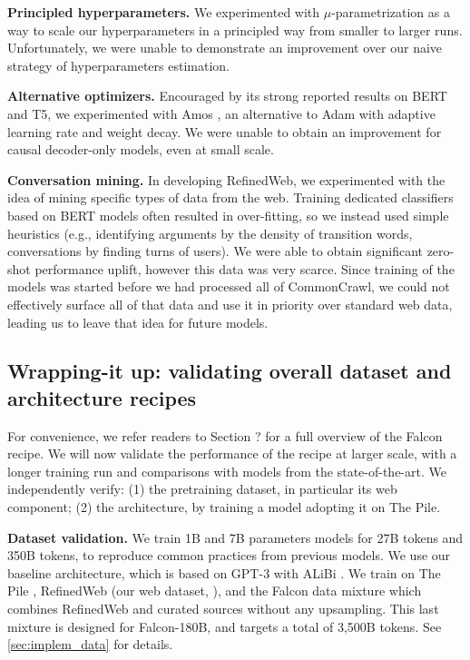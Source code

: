 \documentclass{article}
\begin{document}
\textbf{Principled hyperparameters.} We experimented with $\mu$-parametrization \citep{yang2022tensor} as a way to scale our hyperparameters in a principled way from smaller to larger runs. Unfortunately, we were unable to demonstrate an improvement over our naive strategy of hyperparameters estimation.

\textbf{Alternative optimizers.} Encouraged by its strong reported results on BERT and T5, we experimented with Amos \citep{tian2022amos}, an alternative to Adam with adaptive learning rate and weight decay. We were unable to obtain an improvement for causal decoder-only models, even at small scale. 

\textbf{Conversation mining.} In developing RefinedWeb, we experimented with the idea of mining specific types of data from the web. Training dedicated classifiers based on BERT models often resulted in over-fitting, so we instead used simple heuristics (e.g., identifying arguments by the density of transition words, conversations by finding turns of users). We were able to obtain significant zero-shot performance uplift, however this data was very scarce. Since training of the models was started before we had processed all of CommonCrawl, we could not effectively surface all of that data and use it in priority over standard web data, leading us to leave that idea for future models.

\subsection{Wrapping-it up: validating overall dataset and architecture recipes}
\vspace{-0.1in}

For convenience, we refer readers to Section ? for a full overview of the Falcon recipe. We will now validate the performance of the recipe at larger scale, with a longer training run and comparisons with models from the state-of-the-art. We independently verify: (1) the pretraining dataset, in particular its web component; (2) the architecture, by training a model adopting it on The Pile. 

\textbf{Dataset validation.} We train 1B and 7B parameters models for 27B tokens and 350B tokens, to reproduce common practices from previous models. We use our baseline architecture, which is based on GPT-3 \citep{brown2020gpt3} with ALiBi \citep{press2021alibi}. We train on The Pile \citep{gao2020pile}, RefinedWeb (our web dataset, \citet{refinedweb}), and the Falcon data mixture which combines RefinedWeb and curated sources without any upsampling. This last mixture is designed for Falcon-180B, and targets a total of 3,500B tokens. See \cref{sec:implem_data} for details.
\end{document}

